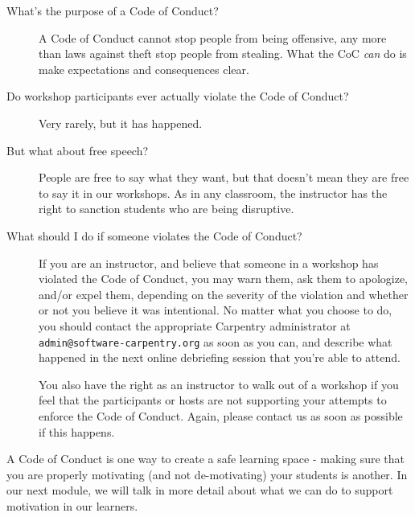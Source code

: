 \begin{description}
\item[What's the purpose of a Code of Conduct?]
A Code of Conduct cannot stop people from being offensive, any more than
laws against theft stop people from stealing. What the CoC \emph{can} do
is make expectations and consequences clear.
\item[Do workshop participants ever actually violate the Code of
Conduct?]
Very rarely, but it has happened.
\item[But what about free speech?]
People are free to say what they want, but that doesn't mean they are
free to say it in our workshops. As in any classroom, the instructor has
the right to sanction students who are being disruptive.
\item[What should I do if someone violates the Code of Conduct?]
If you are an instructor, and believe that someone in a workshop has
violated the Code of Conduct, you may warn them, ask them to apologize,
and/or expel them, depending on the severity of the violation and
whether or not you believe it was intentional. No matter what you choose
to do, you should contact the appropriate Carpentry administrator at
\texttt{admin@software-carpentry.org}
as soon as you can, and describe what happened in the next online
debriefing session that you're able to attend.

You also have the right as an instructor to walk out of a workshop if
you feel that the participants or hosts are not supporting your attempts
to enforce the Code of Conduct. Again, please contact us as soon as
possible if this happens.
\end{description}

A Code of Conduct is one way to create a safe learning space - making
sure that you are properly motivating (and not de-motivating) your
students is another. In our next module, we will talk in more detail
about what we can do to support motivation in our learners.

